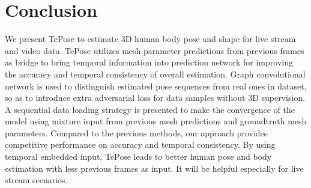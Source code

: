 \documentclass[10pt,twocolumn,letterpaper]{article}
\begin{document}
\section{Conclusion}


We present TePose to estimate 3D human body pose and shape for live stream and video data. TePose utilizes mesh parameter predictions from previous frames as bridge to bring temporal information into prediction network for improving the accuracy and temporal consistency of overall estimation. Graph convolutional network is used to distinguish estimated pose sequences from real ones in dataset, so as to introduce extra adversarial loss for data samples without 3D supervision. A sequential data loading strategy is presented to make the convergence of the model using mixture input from previous mesh predictions and groundtruth mesh parameters. Compared to the previous methods, our approach provides competitive performance on accuracy and temporal consistency. By using temporal embedded input, TePose  leads to better human pose and body estimation with less previous frames as input. It will be helpful especially for live stream scenarios.


{\small


}
\end{document}
